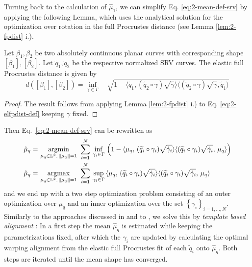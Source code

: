 Turning back to the calculation of $\hat\mu_1$, we can simplify Eq. \ref{eq:2-mean-def-srv} by applying the following Lemma, which uses the analytical solution for the optimization over rotation in the full Procrustes distance (see Lemma \ref{lem:2-fpdist} i.). 

\begin{lemma}
  \label{lem:2-elfpdist}
  Let $\beta_1, \beta_2$ be two absolutely continuous planar curves with corresponding shape $[\beta_1], [\beta_2]$. Let $\widetilde q_1, \widetilde q_2$ be the respective normalized SRV curves.
  The elastic full Procrustes distance is given by
  \begin{equation}
    d([\beta_1],[\beta_2]) = \inf_{\gamma \in \Gamma} \quad \sqrt{ 1 - \langle \widetilde q_1, ( \widetilde q_2 \circ \gamma) \sqrt{\dot\gamma} \rangle \langle (\widetilde q_2 \circ \gamma) \sqrt{\dot\gamma}, \widetilde q_1 \rangle }
  \end{equation}
  \begin{proof}
    The result follows from applying Lemma \ref{lem:2-fpdist} i.) to Eq. \ref{eq:2-elfpdist-def} keeping $\gamma$ fixed.
  \end{proof}
\end{lemma}

\noindent Then Eq.\ \ref{eq:2-mean-def-srv} can be rewritten as
\begin{align}
  \hat\mu_q = &\, \operatorname*{argmin}_{\mu_q \in \mathbb{L}^2,\,\lVert\mu_q\rVert = 1}\,\,
    \sum_{i=1}^N \,\inf_{\gamma_i \in \Gamma}\, \left(1 - \langle \mu_q,\,(\widetilde q_i \circ \gamma_i) \sqrt{\dot\gamma_i} \rangle \langle (\widetilde q_i \circ \gamma_i) \sqrt{\dot\gamma_i},\, \mu_q\rangle \right) \\
  \hat\mu_q = &\, \operatorname*{argmax}_{\mu_q \in \mathbb{L}^2,\,\lVert\mu_q\rVert = 1}\,\,
    \sum_{i=1}^N \,\sup_{\gamma_i \in \Gamma}\, \langle \mu_q,\,(\widetilde q_i \circ \gamma_i) \sqrt{\dot\gamma_i} \rangle \langle (\widetilde q_i \circ \gamma_i) \sqrt{\dot\gamma_i},\, \mu_q\rangle\,
\end{align}
and we end up with a two step optimization problem consisting of an outer optimization over $\mu_q$ and an inner optimization over the set $\left\{\gamma_i\right\}_{i=1,\dots,N}$.
Similarly to the approaches discussed in \cite{SrivastavaKlassen2016} and to \cite{Steyer2021}, we solve this by \emph{template based alignment} \parencite[see e.g.][271]{SrivastavaKlassen2016}:
In a first step the mean $\hat\mu_q$ is estimated while keeping the parametrizations fixed, after which the $\gamma_i$ are updated by calculating the optimal warping alignment from  the elastic full Procrustes fit of each $\widetilde q_i$ onto $\hat\mu_q$.
Both steps are iterated until the mean shape has converged.

